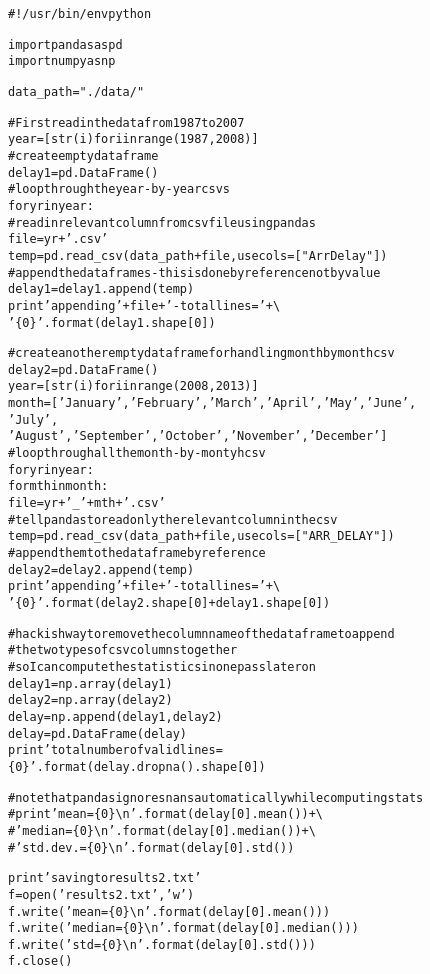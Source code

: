 \documentclass[letterpaper,10pt,english]{/usr/local/lib/python2.7/dist-packages/sphinx/texinputs/sphinxhowto}
\newenvironment{InvisibleVerbatim}
        {\begin{mdframed}[leftmargin=0.1\linewidth,innerleftmargin=3pt,innerrightmargin=3pt, userdefinedwidth=1\linewidth, linewidth=0pt, linecolor=white, usetwoside=false]}
        {\end{mdframed}}
\begin{document}
                \begin{InvisibleVerbatim}
                \vspace{-0.5\baselineskip}
\begin{alltt}\#!/usr/bin/env python

import pandas as pd
import numpy as np

data\_path = "./data/"

\# First read in the data from 1987 to 2007
year = [ str(i) for i in range(1987,2008) ]
\# create empty dataframe
delay1 = pd.DataFrame()
\# loop through the year-by-year csvs
for yr in year:
    \# read in relevant column from csv file using pandas
    file = yr +'.csv'
    temp = pd.read\_csv(data\_path + file, usecols=["ArrDelay"])
    \# append the dataframes - this is done by reference not by value
    delay1 = delay1.append(temp)
    print 'appending '+ file + ' - total lines = ' + \textbackslash{}
            '\{0\}'.format(delay1.shape[0])

\# create another empty dataframe for handling month by month csv
delay2 = pd.DataFrame()
year = [ str(i) for i in range(2008, 2013) ]
month = ['January','February', 'March', 'April', 'May', 'June',
'July',
         'August','September', 'October', 'November', 'December']
\# loop through all the month-by-montyh csv
for yr in year:
    for mth in month:
        file = yr + '\_' + mth + '.csv'
        \# tell pandas to read only the relevant column in the csv
        temp = pd.read\_csv(data\_path + file, usecols=["ARR\_DELAY"])
        \# append them to the dataframe by reference
        delay2 = delay2.append(temp)
        print 'appending ' + file + ' - total lines = ' + \textbackslash{}
            '\{0\}'.format(delay2.shape[0] + delay1.shape[0])

\# hackish way to remove the column name of the dataframe to append
\# the two types of csv columns together
\# so I can compute the statistics in one pass later on
delay1 = np.array(delay1)
delay2 = np.array(delay2)
delay = np.append(delay1, delay2)
delay = pd.DataFrame(delay)
print 'total number of valid lines =
\{0\}'.format(delay.dropna().shape[0])

\# note that pandas ignores nans automatically while computing stats
\#print 'mean = \{0\} \textbackslash{}n'.format(delay[0].mean()) +\textbackslash{}
\#    'median = \{0\} \textbackslash{}n'.format(delay[0].median()) +\textbackslash{}
\#    'std. dev. = \{0\}\textbackslash{}n'.format(delay[0].std())

print 'saving to results2.txt'
f = open('results2.txt', 'w')
f.write('mean = \{0\}\textbackslash{}n'.format(delay[0].mean()))
f.write('median = \{0\}\textbackslash{}n'.format(delay[0].median()))
f.write('std = \{0\}\textbackslash{}n'.format(delay[0].std()))
f.close()
\end{alltt}

            \end{InvisibleVerbatim}
            
\end{document}
